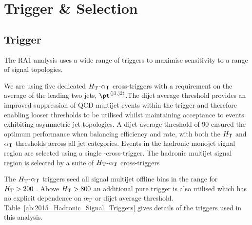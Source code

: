 \section{Trigger \& Selection}
\label{selection}

\subsection{Trigger}


The RA1 analysis uses a wide range of triggers to maximise sensitivity to a range of signal topologies. 

We are using five dedicated  $\mbox{$H_\text{T}$}$-$\alpha_{\text{T}}$ cross-triggers with a requirement on the average \pt of the leading two jets, $\pt^{\rm \left<j1,j2\right>}$.The dijet average threshold provides an improved suppression of QCD multijet events within the trigger and therefore enabling looser \alphat thresholds to be utilised whilst maintaining acceptance to events exhibiting asymmetric jet topologies. A dijet average threshold of 90 \GeV ensured the optimum performance when balancing efficiency and rate, with both the $\mbox{$H_\text{T}$}$ and $\alpha_{\text{T}}$ thresholds across all jet categories.  Events in the hadronic monojet signal region are selected using a single \mht-\met cross-trigger. The hadronic multijet signal region is selected by a suite of $\mbox{$H_\text{T}$}$-$\alpha_{\text{T}}$ cross-triggers  

The $\mbox{$H_\text{T}$}$-$\alpha_{\text{T}}$ triggers seed all signal multijet offline bins in the range for $\mbox{$H_\text{T}$} > 200$ \GeV. Above $\mbox{$H_\text{T}$} > 800$ an additional pure \scalht trigger is also utilised which has no explicit dependence on $\alpha_{\text{T}}$ or dijet average threshold. Table~\ref{ab:2015_Hadronic_Signal_Triggers} gives details of the triggers used in this analysis.

